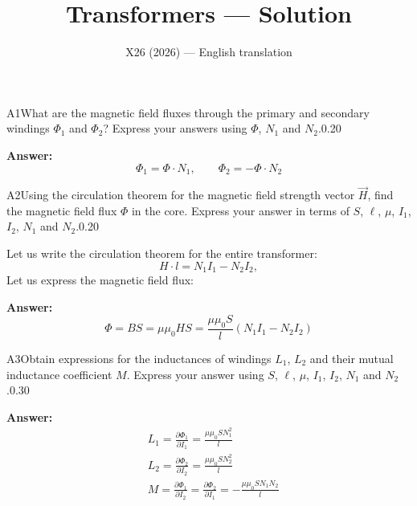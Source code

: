 \documentclass[11pt,a4paper]{article}
\title{\textbf{Transformers --- Solution}}
\author{\normalsize X26 (2026) — English translation}
\date{}
\begin{document}
\maketitle\vspace{-0.5em}
\begin{solcard}{A1}{What are the magnetic field fluxes through the primary and secondary windings $\Phi_1$ and $\Phi_2$? Express your answers using $\Phi$, $N_1$ and $N_2$.}{0.20}
\par\smallskip\noindent\textbf{Answer:} $$\Phi_1=\Phi \cdot N_1,\qquad \Phi_2 =- \Phi \cdot N_2$$
\end{solcard}

\begin{solcard}{A2}{Using the circulation theorem for the magnetic field strength vector $\vec H$, find the magnetic field flux $\Phi$ in the core. Express your answer in terms of $S$, $\ell$, $\mu$, $I_1$, $I_2$, $N_1$ and $N_2$.}{0.20}

Let us write the circulation theorem for the entire transformer: $$H\cdot l = N_1I_1-N_2I_2,$$Let us express the magnetic field flux:

\par\smallskip\noindent\textbf{Answer:} $$\Phi=BS=\mu \mu_0HS= \frac{\mu\mu_0S}{l}(N_1I_1 - N_2I_2)$$
\end{solcard}

\begin{solcard}{A3}{Obtain expressions for the inductances of windings $L_1$, $L_2$ and their mutual inductance coefficient $M$. Express your answer using $S$, $\ell$, $\mu$, $I_1$, $I_2$, $N_1$ and $N_2$.}{0.30}
\par\smallskip\noindent\textbf{Answer:} $$ \begin{aligned} & L_1=\frac{\partial \Phi_1}{\partial I_1}=\frac{\mu \mu_0 S N_1^2}{l} \\ & L_2=\frac{\partial \Phi_2}{\partial I_2}=\frac{\mu \mu_0 S N_2^2}{l} \\ & M=\frac{\partial \Phi_1}{\partial I_2}=\frac{\partial \Phi_2}{\partial I_1}=-\frac{\mu \mu_0 S N_1N_2}{l} \end{aligned} $$
\end{solcard}
\end{document}
